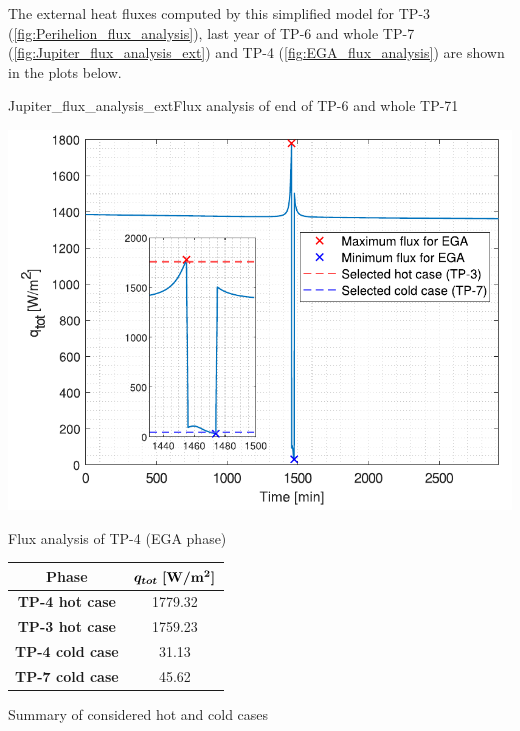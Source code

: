 The external heat fluxes computed by this simplified model for TP-3 (\autoref{fig:Perihelion_flux_analysis}), last year of TP-6 and whole TP-7 (\autoref{fig:Jupiter_flux_analysis_ext}) and TP-4 (\autoref{fig:EGA_flux_analysis}) are shown in the plots below.

    {Jupiter_flux_analysis_ext}{Flux analysis of end of TP-6 and whole TP-7}{1}

\begin{minipage}{0.5\linewidth}
    \centering
    \captionsetup{type=figure}
    \includegraphics[width=\linewidth]{Images/EGA_flux_analysis.pdf}
    \caption{Flux analysis of TP-4 (EGA phase)}
    \label{fig:EGA_flux_analysis}
\end{minipage}\hfill
\begin{minipage}{0.5\linewidth}
    \centering
    \captionsetup{type=table}
    \renewcommand{\arraystretch}{1.4}
    \begin{tabular}{|c|c|}
        \hline
        \textbf{Phase} & $\boldsymbol{q_{tot} \; [\textrm{\textbf{W}}/\textrm{\textbf{m}}^2]}$\\
        \hline
        \hline
        \textbf{TP-4 hot case}      & 1779.32   \\
        \hline
        \textbf{TP-3 hot case}      & 1759.23   \\
        \hline
        \hline
        \textbf{TP-4 cold case}     & 31.13     \\
        \hline
        \textbf{TP-7 cold case}     & 45.62     \\
        \hline
    \end{tabular}
    \caption{Summary of considered hot and cold cases}
    \label{table:cases}
\end{minipage}

